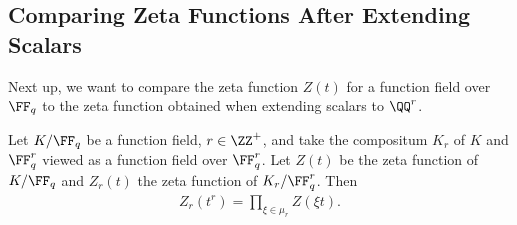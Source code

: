 \hypertarget{comparing-zeta-functions-after-extending-scalars}{%
\subsection{Comparing Zeta Functions After Extending
Scalars}\label{comparing-zeta-functions-after-extending-scalars}}

Next up, we want to compare the zeta function \(Z(t)\) for a function
field over \(\FF_q\) to the zeta function obtained when extending
scalars to \(\QQ^r\).

\begin{proposition}

Let \(K/\FF_q\) be a function field, \(r\in \ZZ^+\), and take the
compositum \(K_r\) of \(K\) and \(\FF_q^r\) viewed as a function field
over \(\FF_q^r\). Let \(Z(t)\) be the zeta function of \(K/\FF_q\) and
\(Z_r(t)\) the zeta function of \(K_r/\FF_q^r\). Then
\begin{align*}  
Z_r(t^r) = \prod_{\xi \in \mu_r} Z(\xi t)
.\end{align*}

\end{proposition}

